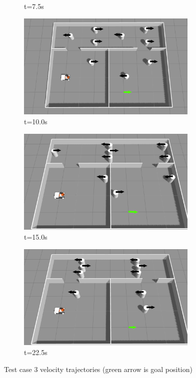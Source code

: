 \begin{figure}[H]
\begin{subfigure}[b]{0.50\linewidth}
        \caption{t=7.5s}
    \end{subfigure}%
    \begin{subfigure}[b]{0.50\linewidth}
        \centering
        \includegraphics[width=0.95\textwidth]{images/test_case_3/mid2.png}
        \caption{t=10.0s}
    \end{subfigure}
    \begin{subfigure}[b]{0.50\linewidth}
        \centering
        \includegraphics[width=0.95\textwidth]{images/test_case_3/exp3.png}
        \caption{t=15.0s}
    \end{subfigure}%
    \begin{subfigure}[b]{0.50\linewidth}
        \centering
        \includegraphics[width=0.95\textwidth]{images/test_case_3/exp4.png}
        \caption{t=22.5s}
    \end{subfigure}
    \caption{Test case 3 velocity trajectories (green arrow is goal position)}\label{fig:double_room}
\end{figure}

